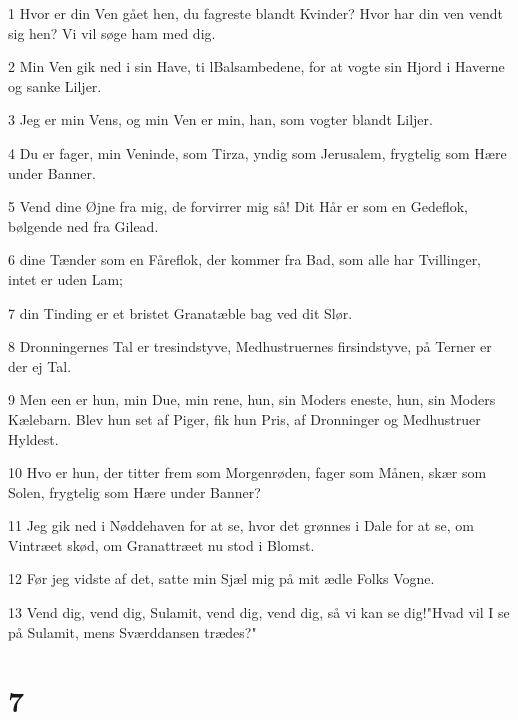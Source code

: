 \par 1 Hvor er din Ven gået hen, du fagreste blandt Kvinder? Hvor har din ven vendt sig hen? Vi vil søge ham med dig.
\par 2 Min Ven gik ned i sin Have, ti lBalsambedene, for at vogte sin Hjord i Haverne og sanke Liljer.
\par 3 Jeg er min Vens, og min Ven er min, han, som vogter blandt Liljer.
\par 4 Du er fager, min Veninde, som Tirza, yndig som Jerusalem, frygtelig som Hære under Banner.
\par 5 Vend dine Øjne fra mig, de forvirrer mig så! Dit Hår er som en Gedeflok, bølgende ned fra Gilead.
\par 6 dine Tænder som en Fåreflok, der kommer fra Bad, som alle har Tvillinger, intet er uden Lam;
\par 7 din Tinding er et bristet Granatæble bag ved dit Slør.
\par 8 Dronningernes Tal er tresindstyve, Medhustruernes firsindstyve, på Terner er der ej Tal.
\par 9 Men een er hun, min Due, min rene, hun, sin Moders eneste, hun, sin Moders Kælebarn. Blev hun set af Piger, fik hun Pris, af Dronninger og Medhustruer Hyldest.
\par 10 Hvo er hun, der titter frem som Morgenrøden, fager som Månen, skær som Solen, frygtelig som Hære under Banner?
\par 11 Jeg gik ned i Nøddehaven for at se, hvor det grønnes i Dale for at se, om Vintræet skød, om Granattræet nu stod i Blomst.
\par 12 Før jeg vidste af det, satte min Sjæl mig på mit ædle Folks Vogne.
\par 13 Vend dig, vend dig, Sulamit, vend dig, vend dig, så vi kan se dig!"Hvad vil I se på Sulamit, mens Sværddansen trædes?"

\chapter{7}

